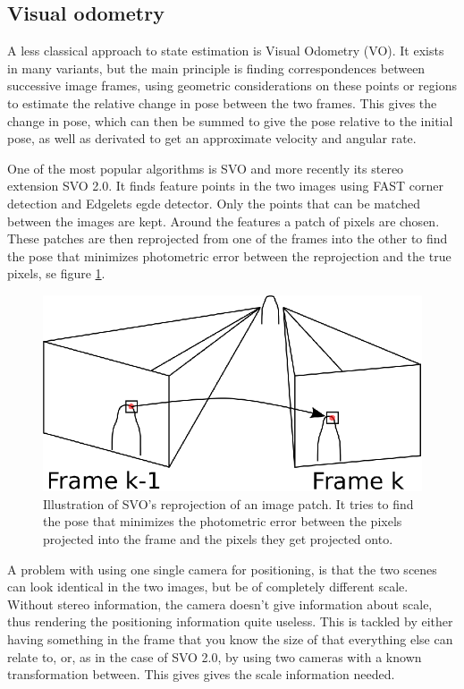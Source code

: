\subsection{Visual odometry}

A less classical approach to state estimation is Visual Odometry (VO). It exists in many variants, but the main principle is finding correspondences between successive image frames, using geometric considerations on these points or regions to estimate the relative change in pose between the two frames. This gives the change in pose, which can then be summed to give the pose relative to the initial pose, as well as derivated to get an approximate velocity and angular rate.

One of the most popular algorithms is SVO\cite{SVO} and more recently its stereo extension SVO 2.0\cite{SVO2}. It finds feature points in the two images using FAST corner detection\cite{FAST} and Edgelets egde detector\cite{Edgelet}. Only the points that can be matched between the images are kept. Around the features a patch of pixels are chosen. These patches are then reprojected from one of the frames into the other to find the pose that minimizes photometric error between the reprojection and the true pixels, se figure \ref{Fig:SVO}. 

\begin{figure}
    \centering
    \includegraphics[width=0.8\linewidth]{0_Images/3_Background/SVO.eps}
    \caption[Illustration of SVO's reprojection of an image patch.]
    {Illustration of SVO's reprojection of an image patch. It tries to find the pose that minimizes the photometric error between the pixels projected into the frame and the pixels they get projected onto.}
    \label{Fig:SVO}
\end{figure}

A problem with using one single camera for positioning, is that the two scenes can look identical in the two images, but be of completely different scale. Without stereo information, the camera doesn't give information about scale, thus rendering the positioning information quite useless. This is tackled by either having something in the frame that you know the size of that everything else can relate to, or, as in the case of SVO 2.0, by using two cameras with a known transformation between. This gives gives the scale information needed. 


